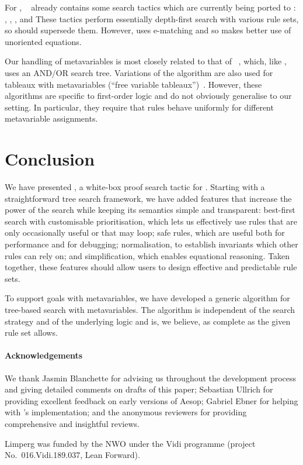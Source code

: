 For \Leanthree, \mathlib~\cite{mathlib} already contains some search tactics which are currently being ported to \Leanfour: \continuity{}, \measurability{}, \tidy{}, \tautology{} and \finish
These tactics perform essentially depth-first search with various rule sets, so \Aesop{} should supersede them.
However, \finish{} uses e-matching and so makes better use of unoriented equations.

Our handling of metavariables is most closely related to that of \Theorema~\cite{Konev05}, which, like \Aesop, uses an AND/OR search tree.
Variations of the \Theorema{} algorithm are also used for tableaux with metavariables (\enquote{free variable tableaux})~\cite{Giese01}.
However, these algorithms are specific to first-order logic and do not obviously generalise to our setting.
In particular, they require that rules behave uniformly for different metavariable assignments.


\section{Conclusion}%
\label{sec:conclusion}

We have presented \Aesop{}, a white-box proof search tactic for \Lean.
Starting with a straightforward tree search framework, we have added features that increase the power of the search while keeping its semantics simple and transparent: best-first search with customisable prioritisation, which lets us effectively use rules that are only occasionally useful or that may loop; safe rules, which are useful both for performance and for debugging; normalisation, to establish invariants which other rules can rely on; and simplification, which enables equational reasoning.
Taken together, these features should allow users to design effective and predictable rule sets.

To support goals with metavariables, we have developed a generic algorithm for tree-based search with metavariables.
The algorithm is independent of the search strategy and of the underlying logic and is, we believe, as complete as the given rule set allows.


\paragraph{Acknowledgements}
We thank Jasmin Blanchette for advising us throughout the development process and giving detailed comments on drafts of this paper; Sebastian Ullrich for providing excellent feedback on early versions of Aesop; Gabriel Ebner for helping with \Aesop's implementation; and the anonymous reviewers for providing comprehensive and insightful reviews.

Limperg was funded by the NWO under the Vidi programme (project No.~016.Vidi.189.037, Lean Forward).
